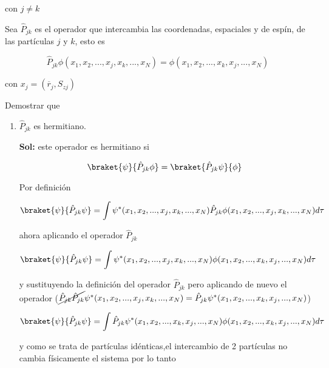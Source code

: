 \documentclass[12pt,a4paper]{article}
\begin{document}
\begin{enumerate}
con $j \neq k$

Sea $\hat{P}_{jk}$ es el operador que intercambia las coordenadas, espaciales y de espín, de las partículas $j$ y $k$, esto es

\begin{equation*}
    \hat{P}_{jk} \phi(x_1,x_2,...,x_j,x_k,...,x_N) = \phi(x_1,x_2,...,x_k,x_j,...,x_N)
\end{equation*}

con $x_j = (\overline{r}_{j}, S_{zj})$

Demostrar que 

\begin{enumerate}
    \item $\hat{P}_{jk}$ es hermitiano.
    
    \textbf{Sol:} este operador es hermitiano si
    
    \begin{equation*}
        \braket{\psi}{\hat{P}_{jk} \phi} = \braket{\hat{P}_{jk} \psi}{\phi}
    \end{equation*}
    
    Por definición
    
    \begin{equation*}
        \braket{\psi}{\hat{P}_{jk} \psi} =\int \psi^*(x_1,x_2,...,x_j,x_k,...,x_N) \hat{P}_{jk}\phi(x_1,x_2,...,x_j,x_k,...,x_N) d\tau
    \end{equation*}
    
    ahora aplicando el operador $\hat{P}_{jk}$
    
    \begin{equation*}
        \braket{\psi}{\hat{P}_{jk} \psi} = \int \psi^*(x_1,x_2,...,x_j,x_k,...,x_N)\phi(x_1,x_2,...,x_k,x_j,...,x_N) d\tau
    \end{equation*}
    
    
    y sustituyendo la definición del operador $\hat{P}_{jk}$ pero aplicando de nuevo el operador ($\cancel{\hat{P}_{jk} \hat{P}_{jk}}\psi^*(x_1,x_2,...,x_j,x_k,...,x_N) = \hat{P}_{jk} \psi^*(x_1,x_2,...,x_k,x_j,...,x_N) $)
    
    \begin{equation*}
       \braket{\psi}{\hat{P}_{jk} \psi}  = \int \hat{P}_{jk} \psi^{*}(x_1,x_2,...,x_k,x_j,...,x_N) \phi(x_1,x_2,...,x_k,x_j,...,x_N)d\tau 
    \end{equation*}
    
    y como se trata de partículas idénticas,el intercambio de 2 partículas no cambia físicamente el sistema por lo tanto
    

\end{enumerate}
\end{enumerate}
\end{document}

